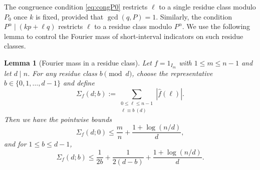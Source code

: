 \documentclass[12pt]{amsart}
\newtheorem{lemma}[theorem]{Lemma}
\begin{document}
The congruence condition \eqref{eq:congP0} restricts $\ell$ to a single residue class modulo $P_0$ once $k$ is fixed, provided that $\gcd(q,P)=1$. Similarly, the condition $P^{\alpha}\mid(kp+\ell q)$ restricts $\ell$ to a residue class modulo $P^{\alpha}$. We use the following lemma to control the Fourier mass of short-interval indicators on such residue classes. 

\begin{lemma}[Fourier mass in a residue class]
\label{lem:sigmaResidue}
Let $f=1_{I_m}$ with $1\le m\le n-1$ and let $d\mid n$.
For any residue class $b\pmod d$, choose the representative $b\in\{0,1,\dots,d-1\}$ and define
\[
\Sigma_f(d;b):=\sum_{\substack{0\le \ell\le n-1\\ \ell\equiv b\ (d)}}|\widehat{f}(\ell)|.
\]
Then we have the pointwise bounds
\[
\Sigma_f(d;0)\le \frac{m}{n}+\frac{1+\log(n/d)}{d},
\]
and for $1\le b\le d-1$,
\[
\Sigma_f(d;b)\le \frac{1}{2b}+\frac{1}{2(d-b)}+\frac{1+\log(n/d)}{d}.
\]
\end{lemma}
\end{document}
